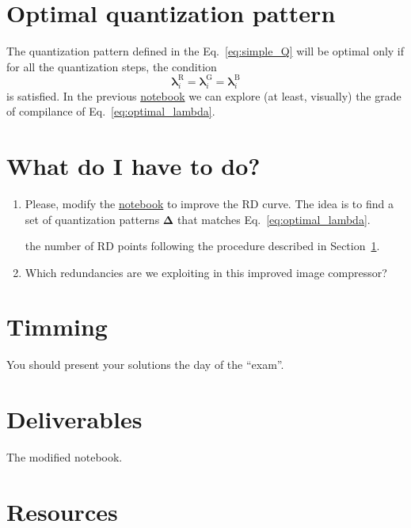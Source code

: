 \section{Optimal quantization pattern}
\label{sec:optimal_RD}
The quantization pattern defined in the Eq.~\eqref{eq:simple_Q} will
be optimal only if for all the quantization steps, the condition
\begin{equation}
  \mathbf{\lambda}^{\text{R}}_i = \mathbf{\lambda}^{\text{G}}_i =
  \mathbf{\lambda}^{\text{B}}_i
  \label{eq:optimal_lambda}
\end{equation}
is satisfied. In the previous
\href{https://github.com/Sistemas-Multimedia/Sistemas-Multimedia.github.io/blob/master/contents/RGB_SQ/RGB_SQ.ipynb}{notebook}
we can explore (at least, visually) the grade of compilance of
Eq.~\eqref{eq:optimal_lambda}.

\section{What do I have to do?}

\begin{enumerate}
\item Please, modify the
  \href{https://github.com/Sistemas-Multimedia/Sistemas-Multimedia.github.io/blob/master/contents/RGB_SQ/RGB_SQ.ipynb}{notebook}
  to improve the RD curve. The idea is to find a set of quantization
  patterns $\mathbf\Delta$ that matches Eq.~\eqref{eq:optimal_lambda}.

  the number of RD points following the procedure described
  in Section~\ref{sec:optimal_RD}.
\item Which redundancies are we exploiting in this improved image
  compressor?
\end{enumerate}

\section{Timming}

You should present your solutions the day of the ``exam''.

\section{Deliverables}

The modified notebook.

\section{Resources}

